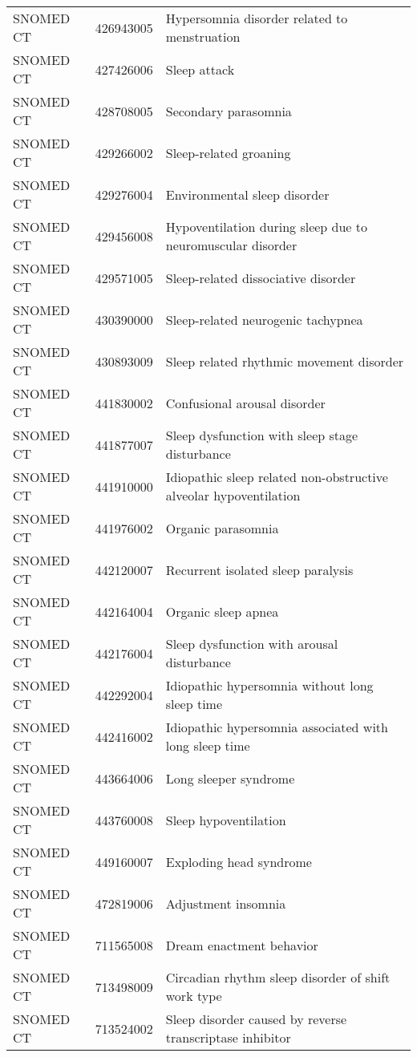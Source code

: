 \begin{longtable}{p{}p{}p{}}
  SNOMED CT & 426943005 & Hypersomnia disorder related to menstruation \\ 
  SNOMED CT & 427426006 & Sleep attack \\ 
  SNOMED CT & 428708005 & Secondary parasomnia \\ 
  SNOMED CT & 429266002 & Sleep-related groaning \\ 
  SNOMED CT & 429276004 & Environmental sleep disorder \\ 
  SNOMED CT & 429456008 & Hypoventilation during sleep due to neuromuscular disorder \\ 
  SNOMED CT & 429571005 & Sleep-related dissociative disorder \\ 
  SNOMED CT & 430390000 & Sleep-related neurogenic tachypnea \\ 
  SNOMED CT & 430893009 & Sleep related rhythmic movement disorder \\ 
  SNOMED CT & 441830002 & Confusional arousal disorder \\ 
  SNOMED CT & 441877007 & Sleep dysfunction with sleep stage disturbance \\ 
  SNOMED CT & 441910000 & Idiopathic sleep related non-obstructive alveolar hypoventilation \\ 
  SNOMED CT & 441976002 & Organic parasomnia \\ 
  SNOMED CT & 442120007 & Recurrent isolated sleep paralysis \\ 
  SNOMED CT & 442164004 & Organic sleep apnea \\ 
  SNOMED CT & 442176004 & Sleep dysfunction with arousal disturbance \\ 
  SNOMED CT & 442292004 & Idiopathic hypersomnia without long sleep time \\ 
  SNOMED CT & 442416002 & Idiopathic hypersomnia associated with long sleep time \\ 
  SNOMED CT & 443664006 & Long sleeper syndrome \\ 
  SNOMED CT & 443760008 & Sleep hypoventilation \\ 
  SNOMED CT & 449160007 & Exploding head syndrome \\ 
  SNOMED CT & 472819006 & Adjustment insomnia \\ 
  SNOMED CT & 711565008 & Dream enactment behavior \\ 
  SNOMED CT & 713498009 & Circadian rhythm sleep disorder of shift work type \\ 
  SNOMED CT & 713524002 & Sleep disorder caused by reverse transcriptase inhibitor \\ 

\end{longtable}
